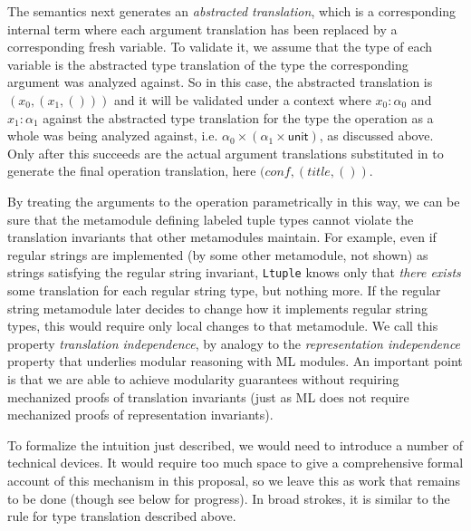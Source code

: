 The semantics next generates an \emph{abstracted translation}, which is a corresponding internal term where each argument translation has been replaced by a corresponding fresh variable. To validate it, we assume that the type of each variable is the abstracted type translation of the type the corresponding argument was analyzed against. So in this case, the abstracted translation is $(x_0, (x_1, ()))$ and it will be validated under a context where $x_0 : \alpha_0$ and  $x_1 : \alpha_1$ against the abstracted type translation for the type the operation as a whole was being analyzed against, i.e. $\alpha_0 \times (\alpha_1 \times \mathsf{unit})$, as discussed above. Only after this succeeds are the actual argument translations substituted in to generate the final operation translation, here $({conf}, ({title}, ())$.

By treating the arguments to the operation parametrically in this way, we can be sure that the metamodule defining labeled tuple types cannot violate the translation invariants that other metamodules maintain. For example, even if regular strings are implemented (by some other metamodule, not shown) as strings satisfying the regular string invariant, \lstinline{Ltuple} knows only that \emph{there exists} some translation for each regular string type, but nothing more. If the regular string metamodule later decides to change how it implements regular string types, this would require only local changes to that metamodule. We call this property \emph{translation independence}, by analogy to the \emph{representation independence} property that underlies modular reasoning with ML modules. An important point is that we are able to achieve modularity guarantees without requiring mechanized proofs of translation invariants (just as ML does not require mechanized proofs of representation invariants). %

To formalize the intuition just described, we would need to introduce a number of technical devices. It would require too much space to give a comprehensive formal account of this mechanism in this proposal, so  we leave this as work that remains to be done (though see below for progress). In broad strokes, it is similar to the rule for type translation described above.

